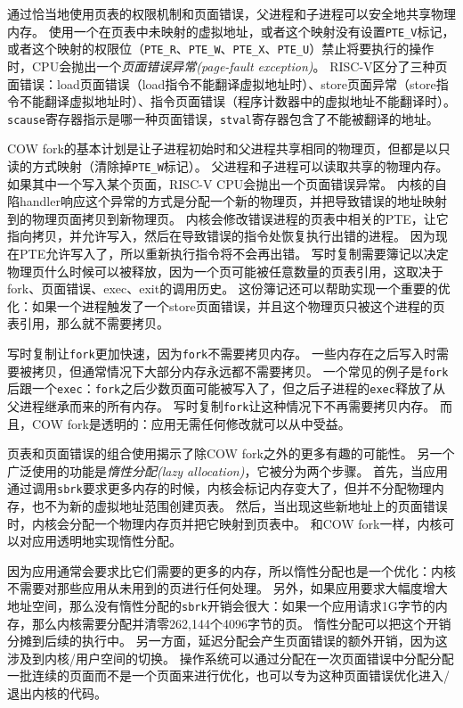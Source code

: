 通过恰当地使用页表的权限机制和页面错误，父进程和子进程可以安全地共享物理内存。
使用一个在页表中未映射的虚拟地址，或者这个映射没有设置\texttt{PTE\_V}标记，或者这个映射的权限位（\texttt{PTE\_R}、\texttt{PTE\_W}、\texttt{PTE\_X}、\texttt{PTE\_U}）禁止将要执行的操作时，CPU会抛出一个\emph{页面错误异常(page-fault exception)}。
RISC-V区分了三种页面错误：load页面错误（load指令不能翻译虚拟地址时）、store页面异常（store指令不能翻译虚拟地址时）、指令页面错误（程序计数器中的虚拟地址不能翻译时）。
\texttt{scause}寄存器指示是哪一种页面错误，\texttt{stval}寄存器包含了不能被翻译的地址。

COW fork的基本计划是让子进程初始时和父进程共享相同的物理页，但都是以只读的方式映射（清除掉\texttt{PTE\_W}标记）。
父进程和子进程可以读取共享的物理内存。
如果其中一个写入某个页面，RISC-V CPU会抛出一个页面错误异常。
内核的自陷handler响应这个异常的方式是分配一个新的物理页，并把导致错误的地址映射到的物理页面拷贝到新物理页。
内核会修改错误进程的页表中相关的PTE，让它指向拷贝，并允许写入，然后在导致错误的指令处恢复执行出错的进程。
因为现在PTE允许写入了，所以重新执行指令将不会再出错。
写时复制需要簿记以决定物理页什么时候可以被释放，因为一个页可能被任意数量的页表引用，这取决于fork、页面错误、exec、exit的调用历史。
这份簿记还可以帮助实现一个重要的优化：如果一个进程触发了一个store页面错误，并且这个物理页只被这个进程的页表引用，那么就不需要拷贝。

写时复制让\texttt{fork}更加快速，因为\texttt{fork}不需要拷贝内存。
一些内存在之后写入时需要被拷贝，但通常情况下大部分内存永远都不需要拷贝。
一个常见的例子是\texttt{fork}后跟一个\texttt{exec}：\texttt{fork}之后少数页面可能被写入了，但之后子进程的\texttt{exec}释放了从父进程继承而来的所有内存。
写时复制\texttt{fork}让这种情况下不再需要拷贝内存。
而且，COW fork是透明的：应用无需任何修改就可以从中受益。

页表和页面错误的组合使用揭示了除COW fork之外的更多有趣的可能性。
另一个广泛使用的功能是\emph{惰性分配(lazy allocation)}，它被分为两个步骤。
首先，当应用通过调用\texttt{sbrk}要求更多内存的时候，内核会标记内存变大了，但并不分配物理内存，也不为新的虚拟地址范围创建页表。
然后，当出现这些新地址上的页面错误时，内核会分配一个物理内存页并把它映射到页表中。
和COW fork一样，内核可以对应用透明地实现惰性分配。

因为应用通常会要求比它们需要的更多的内存，所以惰性分配也是一个优化：内核不需要对那些应用从未用到的页进行任何处理。
另外，如果应用要求大幅度增大地址空间，那么没有惰性分配的\texttt{sbrk}开销会很大：如果一个应用请求1G字节的内存，那么内核需要分配并清零262,144个4096字节的页。
惰性分配可以把这个开销分摊到后续的执行中。
另一方面，延迟分配会产生页面错误的额外开销，因为这涉及到内核/用户空间的切换。
操作系统可以通过分配在一次页面错误中分配分配一批连续的页面而不是一个页面来进行优化，也可以专为这种页面错误优化进入/退出内核的代码。

